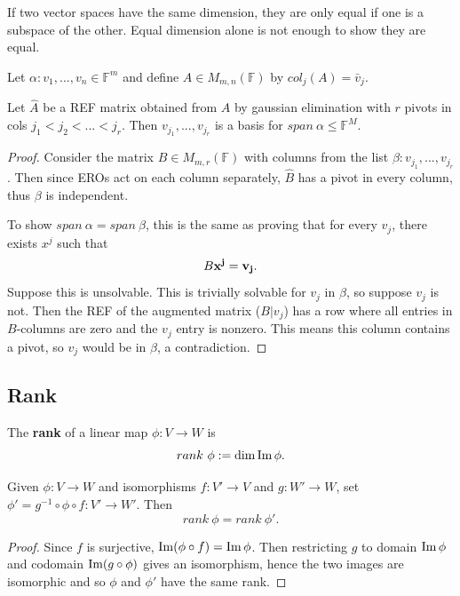 \begin{remark}
    If two vector spaces have the same dimension, they are only equal if one is a subspace of the other. Equal dimension alone is not enough to show they are equal.
\end{remark}

\begin{prop}
  Let $\alpha: v_1,...,v_n \in \mathbb{F}^m$ and define $A \in M_{m,n}(\mathbb{F})$ by $col_j(A) = \bar{v}_j$.

  Let $\hat{A}$ be a REF matrix obtained from $A$ by gaussian elimination with $r$ pivots in cols $j_1 < j_2 <... < j_r$. Then $v_{j_1},...,v_{j_r}$ is a basis for $span \ \alpha \leq \mathbb{F}^M$.
\end{prop}
\begin{proof}
  Consider the matrix $B \in M_{m, r}(\mathbb{F})$ with columns from the list $\beta: v_{j_1},...,v_{j_r}$. Then since EROs act on each column separately, $\hat{B}$ has a pivot in every column, thus $\beta$ is independent.

  To show $span \ \alpha = span \ \beta$, this is the same as proving that for every $v_j$, there exists $x^j$ such that
  \[B \bf{x}^j = v_j.\]
  Suppose this is unsolvable. This is trivially solvable for $v_j$ in $\beta$, so suppose $v_j$ is not. Then the REF of the augmented matrix ($B | v_j$) has a row where all entries in $B$-columns are zero and the $v_j$ entry is nonzero. This means this column contains a pivot, so $v_j$ would be in $\beta$, a contradiction.
\end{proof}

\subsection{Rank}

\begin{definition}
  The {\bf rank} of a linear map $\phi : V \rightarrow W$ is
  \[rank \ \phi := \dim \operatorname{Im} \phi.\]
\end{definition}

\begin{lemma}
  Given $\phi : V \rightarrow W$ and isomorphisms $f : V' \rightarrow V$ and $g : W' \rightarrow W$, set $\phi' = g^{-1} \circ \phi \circ f : V' \rightarrow W'$. Then
  \[rank \ \phi = rank \ \phi'.\]
\end{lemma}
\begin{proof}
  Since $f$ is surjective, $\operatorname{Im} (\phi \circ f) = \operatorname{Im} \phi$. Then restricting $g$ to domain $\operatorname{Im} \phi$ and codomain $\operatorname{Im} (g \circ \phi)$ gives an isomorphism, hence the two images are isomorphic and so $\phi$ and $\phi'$ have the same rank.
\end{proof}

